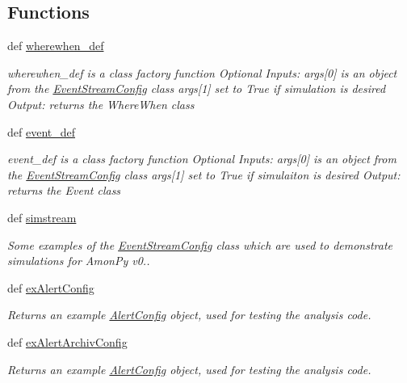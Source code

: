 \subsection*{Functions}
\begin{DoxyCompactItemize}
\item 
def \hyperlink{namespaceamonpy_1_1dbase_1_1db__classes_a17d82764a82f5d4057aa427d04a745cd}{wherewhen\-\_\-def}
\begin{DoxyCompactList}\small\item\em wherewhen\-\_\-def is a class factory function Optional Inputs\-: args\mbox{[}0\mbox{]} is an object from the \hyperlink{classamonpy_1_1dbase_1_1db__classes_1_1_event_stream_config}{Event\-Stream\-Config} class args\mbox{[}1\mbox{]} set to True if simulation is desired Output\-: returns the Where\-When class \end{DoxyCompactList}\item 
def \hyperlink{namespaceamonpy_1_1dbase_1_1db__classes_a6d7088f9593d82867532ef736e26f2f7}{event\-\_\-def}
\begin{DoxyCompactList}\small\item\em event\-\_\-def is a class factory function Optional Inputs\-: args\mbox{[}0\mbox{]} is an object from the \hyperlink{classamonpy_1_1dbase_1_1db__classes_1_1_event_stream_config}{Event\-Stream\-Config} class args\mbox{[}1\mbox{]} set to True if simulaiton is desired Output\-: returns the Event class \end{DoxyCompactList}\item 
def \hyperlink{namespaceamonpy_1_1dbase_1_1db__classes_a5ac6184a9ebdc45d52f961dd4e2ae1fd}{simstream}
\begin{DoxyCompactList}\small\item\em Some examples of the \hyperlink{classamonpy_1_1dbase_1_1db__classes_1_1_event_stream_config}{Event\-Stream\-Config} class which are used to demonstrate simulations for Amon\-Py v0.. \end{DoxyCompactList}\item 
def \hyperlink{namespaceamonpy_1_1dbase_1_1db__classes_a06a8874ab6b9b555ec11356861fb94a2}{ex\-Alert\-Config}
\begin{DoxyCompactList}\small\item\em Returns an example \hyperlink{classamonpy_1_1dbase_1_1db__classes_1_1_alert_config}{Alert\-Config} object, used for testing the analysis code. \end{DoxyCompactList}\item 
def \hyperlink{namespaceamonpy_1_1dbase_1_1db__classes_a67783ae65776e6bb779b928405b44879}{ex\-Alert\-Archiv\-Config}
\begin{DoxyCompactList}\small\item\em Returns an example \hyperlink{classamonpy_1_1dbase_1_1db__classes_1_1_alert_config}{Alert\-Config} object, used for testing the analysis code. \end{DoxyCompactList}\end{DoxyCompactItemize}
